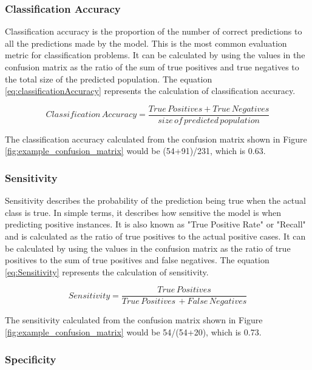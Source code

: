 \documentclass[11pt,openright]{report}
\begin{document}
\subsubsection{Classification Accuracy}
Classification accuracy is the proportion of the number of correct predictions to all the predictions made by the model. This is the most common evaluation metric for classification problems. It can be calculated by using the values in the confusion matrix as the ratio of the sum of true positives and true negatives to the total size of the predicted population. The equation \ref{eq:classificationAccuracy}  represents the calculation of classification accuracy.

\begin{equation}
Classification\, Accuracy = \dfrac{True\, Positives + True\, Negatives}{size\, of\, predicted\, population} \label{eq:classificationAccuracy} 
 \end{equation}

The classification accuracy calculated from the confusion matrix shown in Figure \ref{fig:example_confusion_matrix} would be (54+91)/231, which is 0.63.

\subsubsection{Sensitivity}

Sensitivity describes the probability of the prediction being true when the actual class is true. In simple terms, it describes how sensitive the model is when predicting positive instances. It is also known as "True Positive Rate" or "Recall" and is calculated as the ratio of true positives to the actual positive cases. It can be calculated by using the values in the confusion matrix as the ratio of true positives to the sum of true positives and false negatives. The equation \ref{eq:Sensitivity}  represents the calculation of sensitivity.

\begin{equation}
Sensitivity = \dfrac{True\, Positives }{True\, Positives\, + False\, Negatives} \label{eq:Sensitivity} 
 \end{equation}

The sensitivity calculated from the confusion matrix shown in Figure \ref{fig:example_confusion_matrix} would be 54/(54+20), which is 0.73.


\subsubsection{Specificity}
\end{document}
